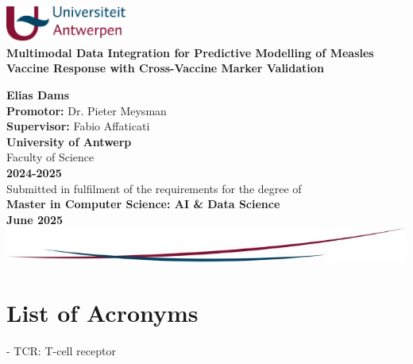 \documentclass[12pt,a4paper]{report}
\begin{document}
\begin{titlepage}
    \centering
    
    \includegraphics[width=0.3\textwidth]{images/uantwerp_logo.png}\\[1cm]
    
    {\Huge \textbf{Multimodal Data Integration for Predictive Modelling of Measles Vaccine Response with Cross-Vaccine Marker Validation}} \\
    \vfill
    
    {\Large \textbf{Elias Dams}}\\[1cm]
    
    \textbf{Promotor:} Dr. Pieter Meysman\\
    \textbf{Supervisor:} Fabio Affaticati\\[1.5cm]
    
    {\Large \textbf{University of Antwerp}}\\
    {\large Faculty of Science}\\[0.5cm]
    
    \textbf{2024-2025}\\[1.5cm]
    
    Submitted in fulfilment of the requirements for the degree of\\
    \textbf{Master in Computer Science: AI \& Data Science}\\[1cm]
    
    \textbf{June 2025}\\[2cm]
    
    \vfill
    \includegraphics[width=1.0\textwidth]{images/bottom_design.jpg}

\end{titlepage}

\tableofcontents
\newpage

\listoffigures

\listoftables

\chapter*{List of Acronyms}
- TCR: T-cell receptor
\end{document}
